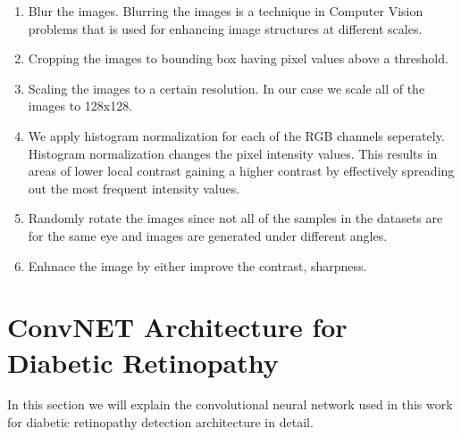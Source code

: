 \begin{enumerate}
    \item Blur the images. Blurring the images is a technique in Computer Vision problems that is used for enhancing image structures at different scales.
    \item Cropping the images to bounding box having pixel values above a threshold.
    \item Scaling the images to a certain resolution. In our case we scale all of the images to 128x128.
    \item We apply histogram normalization for each of the RGB channels seperately. Histogram normalization changes the pixel intensity values. This results in areas of lower local contrast gaining a higher contrast by effectively spreading out the most frequent intensity values.
    \item Randomly rotate the images since not all of the samples in the datasets are for the same eye and images are generated under different angles.
    \item Enhnace the image by either improve the contrast, sharpness.
\end{enumerate}

\section{ConvNET Architecture for Diabetic Retinopathy}
In this section we will explain the convolutional neural network used in this work for diabetic retinopathy detection architecture in detail. 

